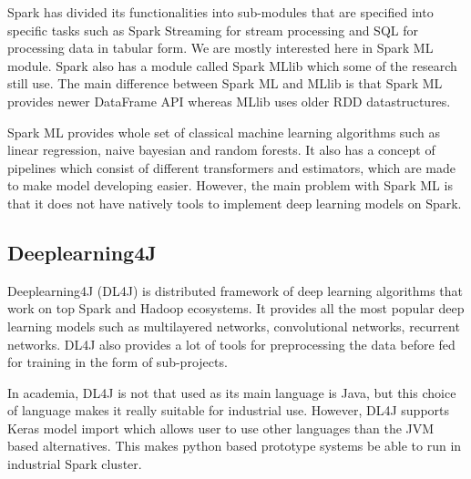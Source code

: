 Spark has divided its functionalities into sub-modules that are specified into specific tasks such as Spark Streaming for stream processing and SQL for processing data in tabular form.
We are mostly interested here in Spark ML module.
Spark also has a module called Spark MLlib which some of the research still use.
The main difference between Spark ML and MLlib is that Spark ML provides newer DataFrame API whereas MLlib uses older RDD datastructures.\cite{amirghodsi}


Spark ML provides whole set of classical machine learning algorithms such as linear regression, naive bayesian and random forests.
It also has a concept of pipelines which consist of different transformers and estimators, which are made to make model developing easier.
However, the main problem with Spark ML is that it does not have natively tools to implement deep learning models on Spark.

\subsection{Deeplearning4J}

Deeplearning4J (DL4J) is distributed framework of deep learning algorithms that work on top Spark and Hadoop ecosystems.
It provides all the most popular deep learning models such as multilayered networks, convolutional networks, recurrent networks.
DL4J also provides a lot of tools for preprocessing the data before fed for training in the form of sub-projects. \cite{dl4j}

In academia, DL4J is not that used as its main language is Java, but this choice of language makes it really suitable for industrial use.
However, DL4J supports Keras model import which allows user to use other languages than the JVM based alternatives.
This makes python based prototype systems be able to run in industrial Spark cluster. \cite{dl4j}

